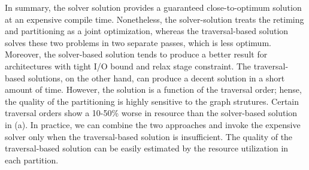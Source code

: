 In summary, the solver solution provides a guaranteed close-to-optimum solution at an expensive
compile time. Nonetheless, the solver-solution treats the retiming and partitioning as a joint optimization,
whereas the traversal-based solution solves these two problems in two separate passes,
which is less optimum.
Moreover, the solver-based solution tends to produce a better result for architectures with tight I/O
bound and relax stage constraint.
The traversal-based solutions, on the other hand, can produce a decent solution in a short amount of
time.
However, the solution is a function of the traversal order; hense, the quality of the partitioning
is highly sensitive to the graph strutures.
Certain traversal orders show a 10-50\% worse in resource than the solver-based solution in 
 (a).
In practice, we can combine the two approaches and invoke the expensive solver only when the
traversal-based solution is insufficient. The quality of the traversal-based solution can be easily estimated by the resource utilization in each partition.

